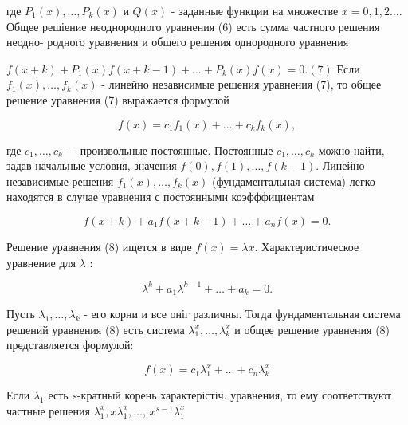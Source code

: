 \documentclass[10pt]{article}
\begin{document}
где $P_{1}(x), \ldots, P_{k}(x)$ и $Q(x)$ - заданные функции на множестве $x=0,1,2 \ldots$. Общее решіение неоднородного уравнения (6) есть сумма частного решения неодно- родного уравнения и общего решения однородного уравнения



$f(x+k)+P_{1}(x) f(x+k-1)+\ldots+P_{k}(x) f(x)=0 .(7)$ Если $f_{1}(x), \ldots, f_{k}(x)$ - линейно независимые решения уравнения (7), то общее решение уравнения (7) выражается формулой



\[

f(x)=c_{1} f_{1}(x)+\ldots+c_{k} f_{k}(x),

\]



где $c_{1}, \ldots, c_{k}-$ произвольные постоянные. Постоянные $c_{1}, \ldots, c_{k}$ можно найти, задав начальные условия, значения $f(0), f(1), \ldots, f(k-1)$. Линейно независимые решения $f_{1}(x), \ldots, f_{k}(x)$ (фундаментальная система) легко находятся в случае уравнения с постоянными коэфффициентам



\[

f(x+k)+a_{1} f(x+k-1)+\ldots+a_{n} f(x)=0 .

\]



Решение уравнения (8) ищется в виде $f(x)=\lambda x$. Характеристическое уравнение для $\lambda$ :



\[

\lambda^{k}+a_{1} \lambda^{k-1}+\ldots+a_{k}=0 .

\]



Пусть $\lambda_{1}, \ldots, \lambda_{k}$ - его корни и все оніг различны. Тогда фундаментальная система решений уравнения (8) есть система $\lambda_{1}^{x}, \ldots, \lambda_{k}^{x}$ и общее решение уравнения (8) представляется формулой:



\[

f(x)=c_{1} \lambda_{1}^{x}+\ldots+c_{n} \lambda_{k}^{x}

\]



Если $\lambda_{1}$ есть $s$-кратный корень характерістіч. уравнения, то ему соответствуют частные решения $\lambda_{1}^{x}, x \lambda_{1}^{x}, \ldots$, $x^{s-1} \lambda_{1}^{x}$
\end{document}
